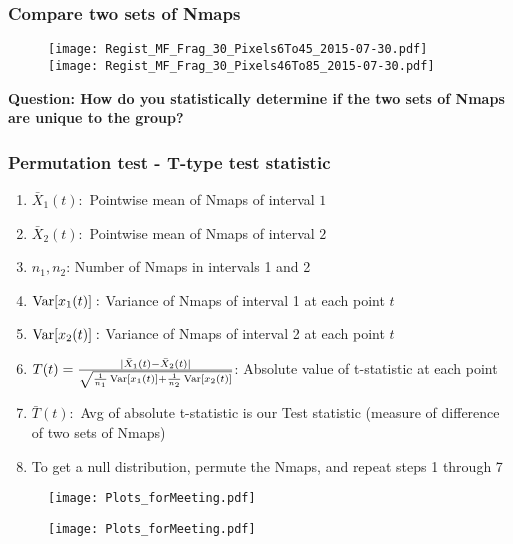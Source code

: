 \documentclass[10pt,dvipsnames,table]{beamer}
\begin{document}
\begin{frame}
\frametitle{Compare two sets of Nmaps}
\begin{center}
\begin{figure}
\texttt{[image: Regist\_MF\_Frag\_30\_Pixels6To45\_2015-07-30.pdf]}
\pause
\texttt{[image: Regist\_MF\_Frag\_30\_Pixels46To85\_2015-07-30.pdf]}
\end{figure}
\end{center}
{\bf{Question: How do you statistically determine if the two sets of Nmaps are unique to the group?}}
\end{frame}

\begin{frame}
\frametitle{Permutation test - T-type test statistic}
\begin{enumerate}
\item $\bar{X}_1(t): $ Pointwise mean of Nmaps of interval $1$
\item $\bar{X}_2(t): $ Pointwise mean of Nmaps of interval $2$
\item $n_1, n_2$: Number of Nmaps in intervals 1 and 2
\item $\operatorname{Var}[x_1(t)]: $ Variance of Nmaps of interval 1 at each point $t$ 
\item $\operatorname{Var}[x_2(t)]: $ Variance of Nmaps of interval 2 at each point $t$ 
\item $T(t) = \frac{|\bar{X}_1(t) - \bar{X}_2(t)|}{\sqrt{\frac{1}{n_1}\operatorname{Var}[x_1(t)] + 
\frac{1}{n_2}\operatorname{Var}[x_2(t)]}}$: Absolute value of t-statistic at each point
\item $\bar{T}(t):$ Avg of absolute t-statistic is our Test statistic (measure of difference of two sets of Nmaps)
\item To get a null distribution, permute the Nmaps, and repeat steps 1 through 7
\end{enumerate}
\end{frame}

\begin{frame}
\begin{figure}
\texttt{[image: Plots\_forMeeting.pdf]}
\end{figure}
\end{frame}

\begin{frame}
\begin{figure}
\texttt{[image: Plots\_forMeeting.pdf]}
\end{figure}
\end{frame}
\end{document}
